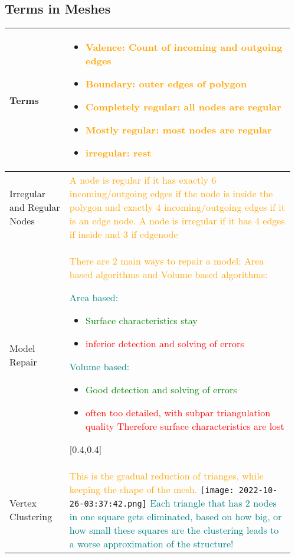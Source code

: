 \documentclass[main.tex,fontsize=8pt,paper=a4,paper=portrait,DIV=calc,]{scrartcl}
\begin{document}
\begin{table}[ht!]
\subsection{Terms in Meshes}
\begin{tabular}{|m{0.2\linewidth}|m{0.755\linewidth}|}
\hline
Terms &
\begin{itemize}
\item \textcolor{orange}{Valence: Count of incoming and outgoing edges}
\item \textcolor{orange}{Boundary: outer edges of polygon}
\item \textcolor{orange}{Completely regular: all nodes are regular}
\item \textcolor{orange}{Mostly regular: most nodes are regular}
\item \textcolor{orange}{irregular: rest}
\vspace{-3mm}
\end{itemize}\\
\hline 
Irregular and Regular Nodes & 
\textcolor{orange}{A node is regular if it has exactly 6 incoming/outgoing edges if the node is inside the polygon and exactly 4 incoming/outgoing edges if it is an edge node.}\newline
\textcolor{orange}{A node is irregular if it has 4 edges if inside and 3 if edgenode}\\
\hline
Model Repair & 
\textcolor{orange}{There are 2 main ways to repair a model: Area based algorithms and Volume based algorithms:}\newline
\minipg{
\textcolor{teal}{Area based:}\newline
\begin{itemize}
  \item \textcolor{green}{ Surface characteristics stay} 
  \item \textcolor{red}{ inferior detection and solving of errors } 
    \, \newline
    \, \newline
\end{itemize}
}{
\textcolor{teal}{Volume based:}\newline
\begin{itemize}
  \item \textcolor{green}{ Good detection and solving of errors} 
  \item \textcolor{red}{ often too detailed, with subpar triangulation quality\newline
    Therefore surface characteristics are lost} 
\end{itemize}
}[0.4,0.4]\\
\hline
Vertex Clustering & 
\textcolor{orange}{This is the gradual reduction of trianges, while keeping the shape of the mesh.}\newline
\texttt{[image: 2022-10-26-03:37:42.png]}\newline
\textcolor{teal}{Each triangle that has 2 nodes in one square gets eliminated, based on how big, or how small these squares are the clustering leads to a worse approximation of the structure!}\\
\hline
\end{tabular}
\end{table}
\end{document}
